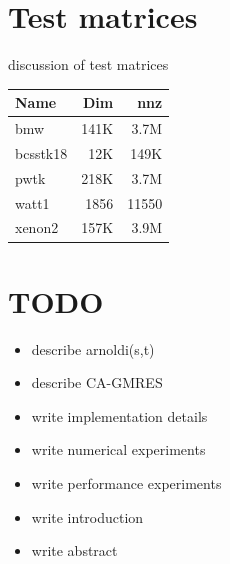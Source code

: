 \documentclass{scrartcl}
\numberwithin{equation}{section}
\begin{document}


 \listofalgorithms
\begin{appendices}
\section{Test matrices}
discussion of test matrices \\

\begin{tabular}{l|r|r}
Name & Dim & nnz \\
\hline
bmw & 141K & 3.7M \\
bcsstk18 & 12K & 149K \\
pwtk & 218K & 3.7M \\
watt1 & 1856 & 11550 \\
xenon2 & 157K & 3.9M
\end{tabular}

\section{TODO}
\begin{itemize}
\item describe arnoldi(s,t)
\item describe CA-GMRES
\item write implementation details
\item write numerical experiments
\item write performance experiments
\item write introduction
\item write abstract
\end{itemize}
\end{appendices}
\end{document}
